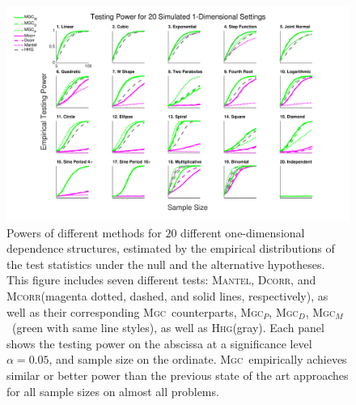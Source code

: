 \documentclass[11pt]{article}
\providecommand{\sct}[1]{{\normalfont\textsc{#1}}}
\newcommand{\Mgc}{\sct{Mgc}}
\newcommand{\Mgcp}{\sct{Mgc$_P$}}
\newcommand{\Mgcd}{\sct{Mgc$_D$}}
\newcommand{\Mgcm}{\sct{Mgc$_M$}}
\newcommand{\Hhg}{\sct{Hhg}}
\newcommand{\Dcorr}{\sct{Dcorr}}
\newcommand{\Mcorr}{\sct{Mcorr}}
\newcommand{\Mantel}{\sct{Mantel}}
\begin{document}
\begin{figure}[htbp]
\includegraphics[width=1.0\textwidth]{Figures/Fig1DPowerAll}
\caption{
Powers of different methods for $20$ different one-dimensional dependence structures, estimated by the empirical distributions of the test statistics under the null and the alternative hypotheses.
This figure includes seven different tests: \Mantel, \Dcorr, and \Mcorr  (magenta dotted, dashed, and solid lines, respectively), as well as their corresponding \Mgc~counterparts, \Mgcp, \Mgcd, \Mgcm~(green with same line styles), as well as \Hhg (gray).
Each panel shows the testing power on the abscissa at a significance level $\alpha=0.05$, and sample size on the ordinate.
\Mgc~empirically achieves similar or better power than the previous state of the art approaches for all sample sizes on almost all problems.}
\label{f:1DAll}
\end{figure}
\end{document}
